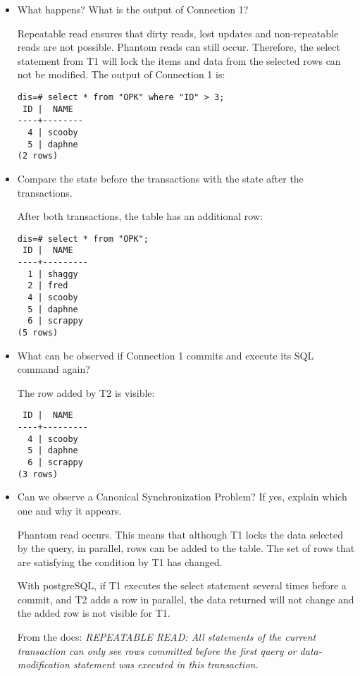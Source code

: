 \documentclass[ngerman]{dis-template-add}
\begin{document}
\begin{itemize}
\item What happens? What is the output of Connection 1?

Repeatable read ensures that dirty reads, lost updates and non-repeatable reads are not possible. Phantom reads can still occur.
Therefore, the select statement from T1 will lock the items and data from the selected rows can not be modified.
The output of Connection 1 is:

\begin{verbatim}
dis=# select * from "OPK" where "ID" > 3;
 ID |  NAME  
----+--------
  4 | scooby
  5 | daphne
(2 rows)
\end{verbatim}

\item Compare the state before the transactions with the state after the transactions.

After both transactions, the table has an additional row:

\begin{verbatim}
dis=# select * from "OPK";
 ID |  NAME   
----+---------
  1 | shaggy
  2 | fred
  4 | scooby
  5 | daphne
  6 | scrappy
(5 rows)
\end{verbatim}

\item What can be observed if Connection 1 commits and execute its SQL command again?

The row added by T2 is visible:

\begin{verbatim}
 ID |  NAME   
----+---------
  4 | scooby
  5 | daphne
  6 | scrappy
(3 rows)
\end{verbatim}

\item Can we observe a Canonical Synchronization Problem? If yes, explain which one and why it appears.

Phantom read occurs. This means that although T1 locks the data selected by the query, in parallel, rows can be added to the table.
The set of rows that are satisfying the condition by T1 has changed.

With postgreSQL, if T1 executes the select statement several times before a commit, and T2 adds a row in parallel, the data returned will not change and the added row is not visible for T1.

From the docs: \textit{REPEATABLE READ: All statements of the current transaction can only see rows committed before the first query or data-modification statement was executed in this transaction.}
\end{itemize}
\end{document}
